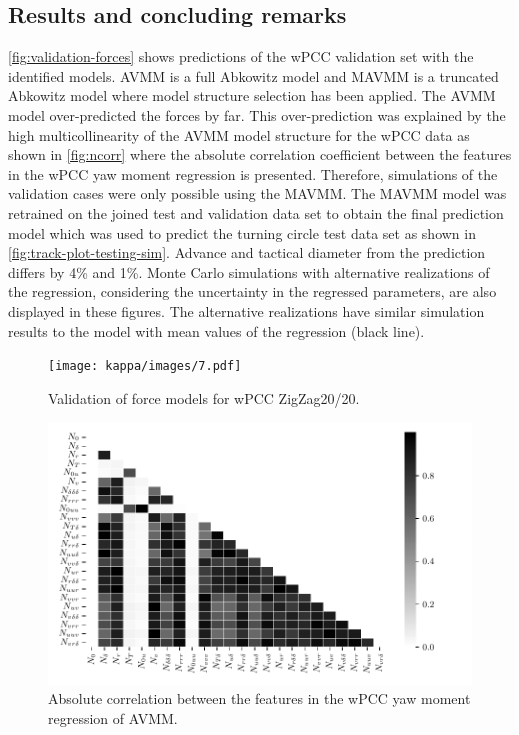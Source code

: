 \subsection*{Results and concluding remarks}
\autoref{fig:validation-forces} shows predictions of the wPCC validation set with the identified models. AVMM is a full Abkowitz model and MAVMM is a truncated Abkowitz model where model structure selection has been applied. The AVMM model over-predicted the forces by far. 
This over-prediction was  explained by the high multicollinearity of the AVMM model structure for the wPCC data as shown in \autoref{fig:ncorr}  where the absolute correlation coefficient between the features in the wPCC yaw moment regression is presented.
Therefore, simulations of the validation cases were only possible using the MAVMM. 
The MAVMM model was retrained on the joined test and validation data set to obtain the final prediction model which was used to predict the turning circle test data set as shown in \autoref{fig:track-plot-testing-sim}. Advance and tactical diameter \cite{imoStandardsShipManoeuvrability2002} from the prediction differs by 4\% and 1\%. Monte Carlo simulations with alternative realizations of the regression, considering the uncertainty in the regressed parameters, are also displayed in these figures. The alternative realizations have similar simulation results to the model with mean values of the regression (black line).
\begin{figure}[h]
\centering
\texttt{[image: kappa/images/7.pdf]}
\caption{Validation of force models for wPCC ZigZag20/20.}\label{fig:validation-forces}
\end{figure}
\begin{figure}[h]
\centering
\includegraphics[width=1.0\textwidth]{kappa/images/10.pdf}
\caption{Absolute correlation between the features in the wPCC yaw moment regression of AVMM.}\label{fig:ncorr}
\end{figure}
